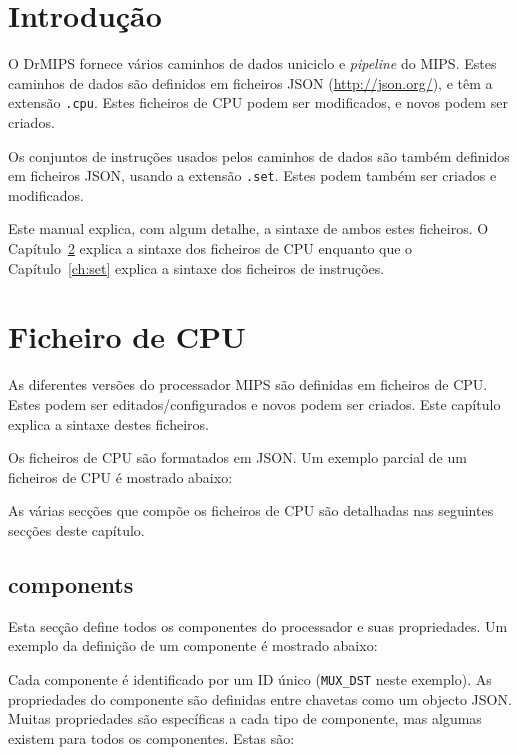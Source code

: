 \documentclass[11pt,a4paper,twoside,titlepage]{report}
\author{Bruno Nova}
\title{\Title}
\begin{document}
\maketitle
\tableofcontents


\chapter{Introdução}

O DrMIPS fornece vários caminhos de dados uniciclo e \emph{pipeline} do MIPS.
Estes caminhos de dados são definidos em ficheiros JSON (\url{http://json.org/}),
e têm a extensão \verb+.cpu+.
Estes ficheiros de CPU podem ser modificados, e novos podem ser criados.

Os conjuntos de instruções usados pelos caminhos de dados são também definidos
em ficheiros JSON, usando a extensão \verb+.set+.
Estes podem também ser criados e modificados.

Este manual explica, com algum detalhe, a sintaxe de ambos estes ficheiros.
O Capítulo~\ref{ch:cpu} explica a sintaxe dos ficheiros de CPU enquanto que
o Capítulo~\ref{ch:set} explica a sintaxe dos ficheiros de instruções.


\chapter{Ficheiro de CPU} \label{ch:cpu}

As diferentes versões do processador MIPS são definidas em ficheiros de CPU.
Estes podem ser editados/configurados e novos podem ser criados.
Este capítulo explica a sintaxe destes ficheiros.

Os ficheiros de CPU são formatados em JSON.
Um exemplo parcial de um ficheiros de CPU é mostrado abaixo:



As várias secções que compõe os ficheiros de CPU são detalhadas nas seguintes
secções deste capítulo.


\section{components}

Esta secção define todos os componentes do processador e suas propriedades.
Um exemplo da definição de um componente é mostrado abaixo:



Cada componente é identificado por um ID único (\verb+MUX_DST+ neste exemplo).
As propriedades do componente são definidas entre chavetas como um objecto
JSON. Muitas propriedades são específicas a cada tipo de componente, mas
algumas existem para todos os componentes. Estas são:
\end{document}
